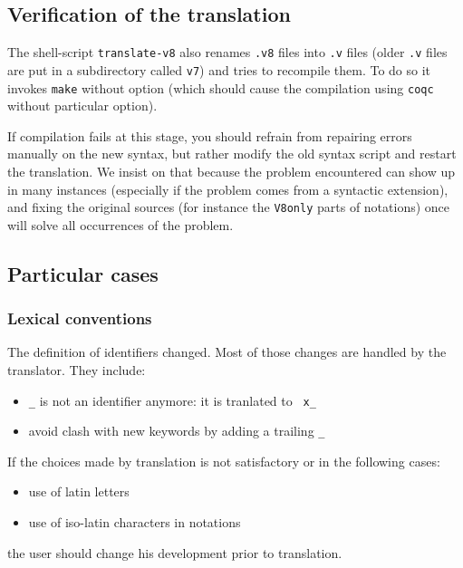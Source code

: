 \documentclass[11pt,a4paper]{article}
\begin{document}
\subsection{Verification of the translation}

The shell-script {\tt translate-v8} also renames {\tt .v8} files into
{\tt .v} files (older {\tt .v} files are put in a subdirectory called
{\tt v7}) and tries to recompile them. To do so it invokes {\tt make}
without option (which should cause the compilation using {\tt coqc}
without particular option).

If compilation fails at this stage, you should refrain from repairing
errors manually on the new syntax, but rather modify the old syntax
script and restart the translation. We insist on that because the
problem encountered can show up in many instances (especially if the
problem comes from a syntactic extension), and fixing the original
sources (for instance the {\tt V8only} parts of notations) once will
solve all occurrences of the problem.


\subsection{Particular cases}

\subsubsection{Lexical conventions}

The definition of identifiers changed. Most of those changes are
handled by the translator. They include:
\begin{itemize}
\item {\tt \_} is not an identifier anymore: it is tranlated to {\tt
x\_}
\item avoid clash with new keywords by adding a trailing {\tt \_}
\end{itemize}

If the choices made by translation is not satisfactory
or in the following cases:
\begin{itemize}
\item use of latin letters
\item use of iso-latin characters in notations
\end{itemize}
the user should change his development prior to translation.
\end{document}
